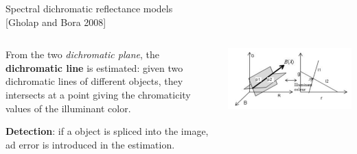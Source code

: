 \begin{tframe}{Spectral dichromatic reflectance models\\{\small [Gholap and Bora 2008]}}
\vspace{0.1cm}
\begin{minipage}{\textwidth}
\begin{columns}[T]
\begin{column}{0.5\textwidth}
\vspace{0.4cm}
From the two \emph{dichromatic plane}, the \textbf{dichromatic line} is estimated: given two dichromatic lines of different objects, they intersects at a point giving the chromaticity values of the illuminant color. 

\vspace{1.1cm}

\textbf{Detection}: if a object is spliced into the image, ad error is introduced in the estimation.
\end{column}
\begin{column}{0.4\textwidth}
\centering
\vspace{1.5cm}

\includegraphics[width=\textwidth]{images/dichromatic-plane.jpg}
\end{column}
\end{columns}
\end{minipage}
\end{tframe}


